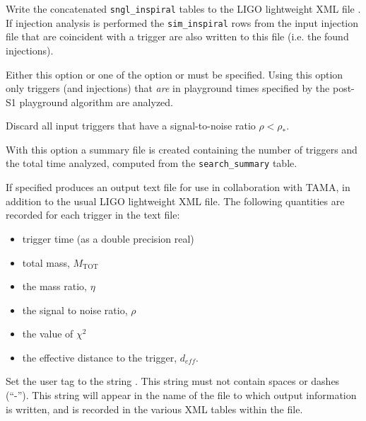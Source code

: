 \begin{entry}
\begin{entry}
\item[\option{--output} \parm{outfile}]  
Write the concatenated
\verb$sngl_inspiral$ tables to the LIGO lightweight XML file .
If injection analysis is performed the \verb$sim_inspiral$ rows from the input
injection file that are coincident with a trigger are also written to this
file (i.e. the found injections).

\item[ \option{--playground-only}]
Either this option or one of the option  or  must be specified.
Using this option only triggers (and injections) that \emph{are} in playground times specified by the post-S1 playground algorithm are analyzed.

\item[\option{--snr-threshold} \parm{$\rho_\ast$}] 
Discard all input triggers that have a signal-to-noise ratio $\rho < \rho_\ast$.

\item[\option{--summary-file} \parm{file}]
With this option a summary file  is created containing the number of triggers and the total time analyzed, computed from the  \verb$search_summary$ table.

\item[\option{--tama-output} \parm{file}] 
If specified produces
an output text file  for use in collaboration with TAMA, in
addition to the usual LIGO lightweight XML file.  The following quantities are
recorded for each trigger in the text file:

\begin{itemize}
\item trigger time (as a double precision real)
\item total mass, $M_{\mathrm{TOT}}$
\item the mass ratio, $\eta$
\item the signal to noise ratio, $\rho$
\item the value of $\chi^2$
\item the effective distance to the trigger, $d_{eff}$.
\end{itemize}

\item[\option{--user-tag} \parm{comment}]
Set the user tag to the string .  This string must not
contain spaces or dashes (``-'').  This string will appear in the name of
the file to which output information is written, and is recorded in the
various XML tables within the file.


\end{entry}
\end{entry}
